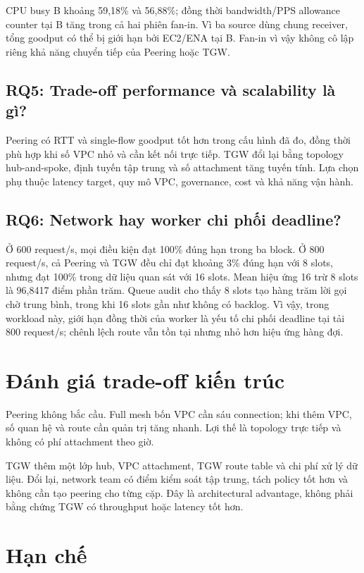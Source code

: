 CPU busy B khoảng 59,18\% và 56,88\%; đồng thời bandwidth/PPS allowance
counter tại B tăng trong cả hai phiên fan-in. Vì ba source dùng chung receiver,
tổng goodput có thể bị giới hạn bởi EC2/ENA tại B. Fan-in vì vậy không cô lập
riêng khả năng chuyển tiếp của Peering hoặc TGW.

\subsection{RQ5: Trade-off performance và scalability là gì?}

Peering có RTT và single-flow goodput tốt hơn trong cấu hình đã đo, đồng thời
phù hợp khi số VPC nhỏ và cần kết nối trực tiếp. TGW đổi lại bằng topology
hub-and-spoke, định tuyến tập trung và số attachment tăng tuyến tính. Lựa chọn
phụ thuộc latency target, quy mô VPC, governance, cost và khả năng vận hành.

\subsection{RQ6: Network hay worker chi phối deadline?}

Ở 600 request/s, mọi điều kiện đạt 100\% đúng hạn trong ba block. Ở 800
request/s, cả Peering và TGW đều chỉ đạt khoảng 3\% đúng hạn với 8 slots, nhưng
đạt 100\% trong dữ liệu quan sát với 16 slots. Mean hiệu ứng 16 trừ 8 slots là
96,8417 điểm phần trăm. Queue audit cho thấy 8 slots tạo hàng trăm lời gọi chờ
trung bình, trong khi 16 slots gần như không có backlog. Vì vậy, trong workload
này, giới hạn đồng thời của worker là yếu tố chi phối deadline tại tải 800
request/s; chênh lệch route vẫn tồn tại nhưng nhỏ hơn hiệu ứng hàng đợi.

\section{Đánh giá trade-off kiến trúc}

Peering không bắc cầu. Full mesh bốn VPC cần sáu connection; khi thêm VPC, số
quan hệ và route cần quản trị tăng nhanh. Lợi thế là topology trực tiếp và
không có phí attachment theo giờ.

TGW thêm một lớp hub, VPC attachment, TGW route table và chi phí xử lý dữ liệu.
Đổi lại, network team có điểm kiểm soát tập trung, tách policy tốt hơn và không
cần tạo peering cho từng cặp. Đây là architectural advantage, không phải bằng
chứng TGW có throughput hoặc latency tốt hơn.

\section{Hạn chế}

